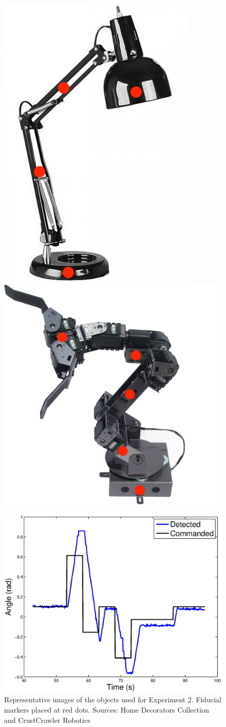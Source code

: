 \documentclass[a4paper,orivec]{llncs}
\begin{document}
\begin{figure}[ht]
  \hfill
  \begin{minipage}{.45\textwidth}
    \centering
    \includegraphics[width=.4\textwidth]{img/lamp.jpg}
    \includegraphics[width=.54\textwidth]{img/arm.jpg}
    \caption{Representative images of the objects used for Experiment 2. Fiducial markers placed at red dots. Sources: Home Decorators Collection and CrustCrawler Robotics}
    \label{fig:lamp+arm}
  \end{minipage}\hfill%
  \begin{minipage}{.45\textwidth}
    \centering
    \includegraphics[width=.8\textwidth]{img/exp2b.eps}

\end{minipage}
\end{figure}
\end{document}
